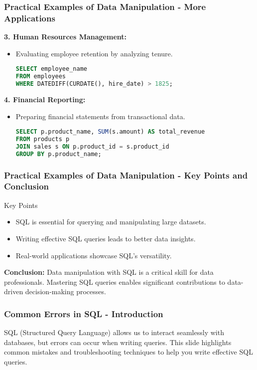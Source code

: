 \documentclass[aspectratio=169]{beamer}
\begin{document}
\begin{frame}[fragile]
    \frametitle{Practical Examples of Data Manipulation - More Applications}
    \textbf{3. Human Resources Management:}
    \begin{itemize}
        \item Evaluating employee retention by analyzing tenure.
        \begin{lstlisting}[language=SQL]
SELECT employee_name
FROM employees
WHERE DATEDIFF(CURDATE(), hire_date) > 1825;
        \end{lstlisting}
    \end{itemize}

    \textbf{4. Financial Reporting:}
    \begin{itemize}
        \item Preparing financial statements from transactional data.
        \begin{lstlisting}[language=SQL]
SELECT p.product_name, SUM(s.amount) AS total_revenue
FROM products p
JOIN sales s ON p.product_id = s.product_id
GROUP BY p.product_name;
        \end{lstlisting}
    \end{itemize}
\end{frame}

\begin{frame}[fragile]
    \frametitle{Practical Examples of Data Manipulation - Key Points and Conclusion}
    \begin{block}{Key Points}
        \begin{itemize}
            \item SQL is essential for querying and manipulating large datasets.
            \item Writing effective SQL queries leads to better data insights.
            \item Real-world applications showcase SQL's versatility.
        \end{itemize}
    \end{block}

    \textbf{Conclusion:} Data manipulation with SQL is a critical skill for data professionals. Mastering SQL queries enables significant contributions to data-driven decision-making processes.
\end{frame}

\begin{frame}[fragile]
    \frametitle{Common Errors in SQL - Introduction}
    SQL (Structured Query Language) allows us to interact seamlessly with databases, but errors can occur when writing queries. This slide highlights common mistakes and troubleshooting techniques to help you write effective SQL queries.
\end{frame}
\end{document}
